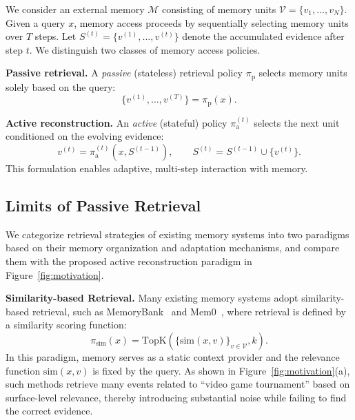 \documentclass{llmxive}
\begin{document}
We consider an external memory $\mathcal{M}$ consisting of memory units
$\mathcal{V}=\{v_1,\dots,v_N\}$.
Given a query $x$, memory access proceeds by sequentially selecting memory
units over $T$ steps. Let
\(
S^{(t)} = \{v^{(1)}, \ldots, v^{(t)}\}
\)
denote the accumulated evidence after step $t$. We distinguish two classes of memory access policies.

\textbf{Passive retrieval.}
A \emph{passive} (stateless) retrieval policy $\pi_{\mathrm{p}}$ selects memory units solely based on the query:
\begin{equation}
\{v^{(1)}, \ldots, v^{(T)}\} = \pi_{\mathrm{p}}(x).
\end{equation}

\textbf{Active reconstruction.}
An \emph{active} (stateful) policy $\pi_{\mathrm{a}}^{(t)}$ selects the next unit conditioned on the evolving evidence:
\begin{equation}
v^{(t)} = \pi_{\mathrm{a}}^{(t)}(x, S^{(t-1)}),
\qquad S^{(t)} = S^{(t-1)} \cup \{v^{(t)}\}.
\end{equation}
This formulation enables adaptive, multi-step interaction with memory.

\subsection{Limits of Passive Retrieval}
\label{subsec:retrieval-failure}
We categorize retrieval strategies of existing memory systems into two paradigms based on their memory organization and adaptation mechanisms, and compare them with the proposed active reconstruction paradigm in Figure~\ref{fig:motivation}.

\textbf{Similarity-based Retrieval.}
Many existing memory systems adopt similarity-based retrieval, such as MemoryBank~\cite{DBLP:conf/aaai/ZhongGGYW24} and Mem0~\cite{DBLP:journals/corr/abs-2504-19413},
where retrieval is defined by a similarity scoring function:
\begin{equation}
\label{eq:pi-sim}
\pi_{\text{sim}}(x)
=
\mathrm{TopK}\!\left(\{ \mathrm{sim}(x,v) \}_{v \in \mathcal{V}}, k \right).
\end{equation}
In this paradigm, memory serves as a static context provider and the relevance function $\mathrm{sim}(x, v)$ is fixed by the query.
As shown in Figure~\ref{fig:motivation}(a), such methods retrieve many events related to ``video game tournament'' based on surface-level relevance, thereby introducing substantial noise while failing to find the correct evidence.
\end{document}
